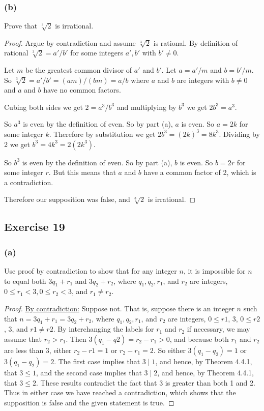 \documentclass[14pt]{extarticle}
\begin{document}
\subsubsection{(b)}
Prove that $\sqrt[3]{2}$ is irrational.

\begin{proof}
    Argue by contradiction and assume $\sqrt[3]{2}$ is rational. By definition of rational $\sqrt[3]{2} = a'/b'$ for some integers $a',b'$ with $b' \neq 0$.

    Let $m$ be the greatest common divisor of $a'$ and $b'$. Let $a = a'/m$ and $b = b'/m$. So $\sqrt[3]{2} = a'/b' = (am) / (bm) = a/b$ where $a$ and $b$ are integers with $b \neq 0$ and $a$ and $b$ have no common factors.

    Cubing both sides we get $2 = a^3 / b^3$ and multiplying by $b^3$ we get $2b^3 = a^3$.

    So $a^3$ is even by the definition of even. So by part (a), $a$ is even. So $a = 2k$ for some integer $k$. Therefore by substitution we get $2b^3 = (2k)^3 = 8k^3$. Dividing by 2 we get $b^3 = 4k^3 = 2(2k^3)$.

    So $b^3$ is even by the definition of even. So by part (a), $b$ is even. So $b = 2r$ for some integer $r$. But this means that $a$ and $b$ have a common factor of 2, which is a contradiction.

    Therefore our supposition was false, and $\sqrt[3]{2}$ is irrational.
\end{proof}

\subsection{Exercise 19}
\subsubsection{(a)}
Use proof by contradiction to show that for any integer $n$, it is impossible for $n$ to equal both $3q_1 + r_1$ and $3q_2 + r_2$, where $q_1, q_2, r_1$, and $r_2$ are integers, $0 \leq r_1 < 3, 0 \leq r_2 < 3$, and $r_1 \neq r_2$.

\begin{proof}
    \underline{By contradiction:} Suppose not. That is, suppose there is an integer $n$ such that $n = 3q_1 + r_1 = 3q_2 + r_2$, where $q_1, q_2, r_1$, and $r_2$ are integers, $0 \leq r1$, 3, $0 \leq r2$, 3, and $r1 \neq r2$. By interchanging the labels for $r_1$ and $r_2$ if necessary, we may assume that $r_2 > r_1$. Then $3(q_1 - q2) = r_2 - r_1 > 0$, and because both $r_1$ and $r_2$ are less than 3, either $r_2 - r1 = 1$ or $r_2 - r_1 = 2$. So either $3(q_1 - q_2) = 1$ or $3(q_1 - q_2) = 2$. The first case implies that $3 \mid 1$, and hence, by Theorem 4.4.1, that $3 \leq 1$, and the second case implies that $3 \mid 2$, and hence, by Theorem 4.4.1, that $3 \leq 2$. These results contradict the fact that 3 is greater than both 1 and 2. Thus in either case we have reached a contradiction, which shows that the supposition is false and the given statement is true.
\end{proof}
\end{document}
